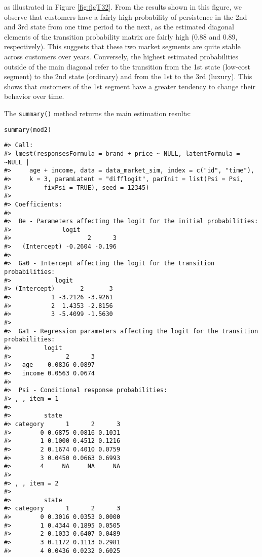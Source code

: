 \noindent as illustrated in Figure \ref{fig:figT32}. From the
results shown in this figure, we observe that customers have a fairly
high probability of persistence in the 2nd and 3rd state from one time
period to the next, as the estimated diagonal elements of the transition
probability matrix are fairly high (0.88 and 0.89, respectively). This
suggests that these two market segments are quite stable across
customers over years. Conversely, the highest estimated probabilities
outside of the main diagonal refer to the transition from the 1st state
(low-cost segment) to the 2nd state (ordinary) and from the 1st to the
3rd (luxury). This shows that customers of the 1st segment have a
greater tendency to change their behavior over time.

The \texttt{summary()} method returns the main estimation results:

\begin{verbatim}
summary(mod2)
\end{verbatim}

\begin{verbatim}
#> Call:
#> lmest(responsesFormula = brand + price ~ NULL, latentFormula = ~NULL | 
#>     age + income, data = data_market_sim, index = c("id", "time"), 
#>     k = 3, paramLatent = "difflogit", parInit = list(Psi = Psi, 
#>         fixPsi = TRUE), seed = 12345)
#> 
#> Coefficients:
#> 
#>  Be - Parameters affecting the logit for the initial probabilities:
#>              logit
#>                     2      3
#>   (Intercept) -0.2604 -0.196
#> 
#>  Ga0 - Intercept affecting the logit for the transition probabilities:
#>            logit
#> (Intercept)       2       3
#>           1 -3.2126 -3.9261
#>           2  1.4353 -2.8156
#>           3 -5.4099 -1.5630
#> 
#>  Ga1 - Regression parameters affecting the logit for the transition probabilities:
#>         logit
#>               2      3
#>   age    0.0836 0.0897
#>   income 0.0563 0.0674
#> 
#>  Psi - Conditional response probabilities:
#> , , item = 1
#> 
#>         state
#> category      1      2      3
#>        0 0.6875 0.0816 0.1031
#>        1 0.1000 0.4512 0.1216
#>        2 0.1674 0.4010 0.0759
#>        3 0.0450 0.0663 0.6993
#>        4     NA     NA     NA
#> 
#> , , item = 2
#> 
#>         state
#> category      1      2      3
#>        0 0.3016 0.0353 0.0000
#>        1 0.4344 0.1895 0.0505
#>        2 0.1033 0.6407 0.0489
#>        3 0.1172 0.1113 0.2981
#>        4 0.0436 0.0232 0.6025
\end{verbatim}

